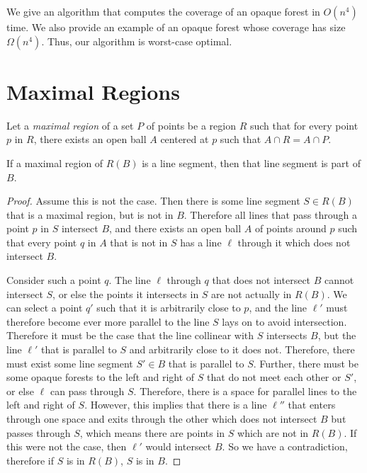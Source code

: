 \documentclass{cccg12}
\begin{document}
We give an algorithm that computes the coverage of an opaque forest in
$O(n^4)$ time. We also provide an example of an opaque forest whose
coverage has size $\Omega(n^4)$. Thus, our algorithm is worst-case
optimal.

\section{Maximal Regions}

 Let a \emph{maximal region} of a set $P$ of points be a region
   $R$ such that for every point $p$ in $R$, there exists an open
   ball $A$ centered at $p$ such that $A \cap R = A \cap P$.

\begin{lemma}
\label{lemma:hasNoLines}
If a maximal region of $R(B)$ is a line segment, then that line segment is part of $B$.
\end{lemma}

\begin{proof}
Assume this is not the case. Then there is some line segment $S \in R(B)$ that is a maximal region, but is not in $B$. Therefore all lines that pass through a point $p$ in $S$ intersect $B$, and there exists an open ball $A$ of points around $p$ such that every point $q$ in $A$ that is not in $S$ has a line $\ell$ through it which does not intersect $B$.

Consider such a point $q$. The line $\ell$ through $q$ that does not intersect $B$ cannot intersect $S$, or else the points it intersects in $S$ are not actually in $R(B)$. We can select a point $q'$ such that it is arbitrarily close to $p$, and the line $\ell'$ must therefore become ever more parallel to the line $S$ lays on to avoid intersection. Therefore it must be the case that the line collinear with $S$ intersects $B$, but the line $\ell'$ that is parallel to $S$ and arbitrarily close to it does not. Therefore, there must exist some line segment $S' \in B$ that is parallel to $S$. Further, there must be some opaque forests to the left and right of $S$ that do not meet each other or $S'$, or else $\ell$ can pass through $S$. Therefore, there is a space for parallel lines to the left and right of $S$. However, this implies that there is a line $\ell''$ that enters through one space and exits through the other which does not intersect $B$ but passes through $S$, which means there are points in $S$ which are not in $R(B)$. If this were not the case, then $\ell'$ would intersect $B$. So we have a contradiction, therefore if $S$ is in $R(B)$, $S$ is in $B$.\end{proof}
\end{document}
